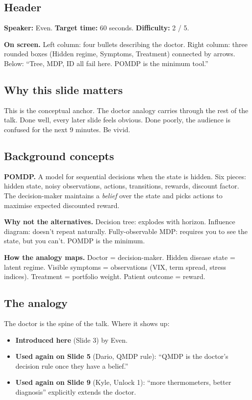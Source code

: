 \documentclass[11pt]{article}
\begin{document}
\subsection*{Header}

\textbf{Speaker:} Even. \quad\textbf{Target time:} 60 seconds. \quad\textbf{Difficulty:} 2 / 5.

\textbf{On screen.} Left column: four bullets describing the doctor. Right column: three rounded boxes (Hidden regime, Symptoms, Treatment) connected by arrows. Below: ``Tree, MDP, ID all fail here. POMDP is the minimum tool.''

\subsection*{Why this slide matters}

This is the conceptual anchor. The doctor analogy carries through the rest of the talk. Done well, every later slide feels obvious. Done poorly, the audience is confused for the next 9 minutes. Be vivid.

\subsection*{Background concepts}

\textbf{POMDP.} A model for sequential decisions when the state is hidden. Six pieces: hidden state, noisy observations, actions, transitions, rewards, discount factor. The decision-maker maintains a \emph{belief} over the state and picks actions to maximise expected discounted reward.

\textbf{Why not the alternatives.} Decision tree: explodes with horizon. Influence diagram: doesn't repeat naturally. Fully-observable MDP: requires you to see the state, but you can't. POMDP is the minimum.

\textbf{How the analogy maps.} Doctor = decision-maker. Hidden disease state = latent regime. Visible symptoms = observations (VIX, term spread, stress indices). Treatment = portfolio weight. Patient outcome = reward.

\subsection*{The analogy}

The doctor is the spine of the talk. Where it shows up:

\begin{itemize}
  \item \textbf{Introduced here} (Slide 3) by Even.
  \item \textbf{Used again on Slide 5} (Dario, QMDP rule): ``QMDP is the doctor's decision rule once they have a belief.''
  \item \textbf{Used again on Slide 9} (Kyle, Unlock 1): ``more thermometers, better diagnosis'' explicitly extends the doctor.
\end{itemize}
\end{document}
